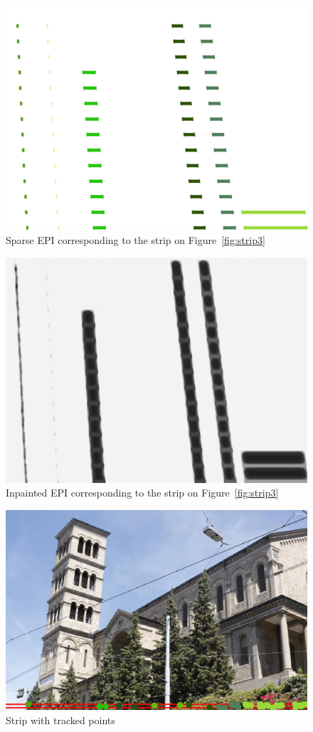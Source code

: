 \begin{itemize}
\begin{figure}[h!]
\centering
\includegraphics[width = 0.7 \textwidth]{./Diagrams/results/EPIs/306_8_102_7_27_6_sparse.png}
\caption{Sparse EPI corresponding to the strip on Figure~\ref{fig:strip3}}
\label{fig:sparse3}
\end{figure}

\begin{figure}[h!]
\centering
\includegraphics[width = 0.7 \textwidth]{./Diagrams/results/Inpainted/306_8_102_7_27_6_inpainted.png}
\caption{Inpainted EPI corresponding to the strip on Figure~\ref{fig:strip3}}
\label{fig:inpainted3}
\end{figure}

\begin{figure}[h!]
\centering
\includegraphics[width = 0.7 \textwidth]{./Diagrams/results/EPIs/292_8_102_7_34_8_strip.png}
\caption{Strip with tracked points}
\label{fig:strip4}
\end{figure}


\end{itemize}
